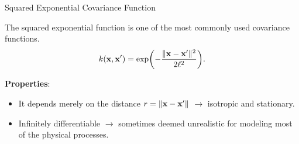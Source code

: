 \documentclass[11pt,compress,t,notes=noshow, xcolor=table]{beamer}
\begin{document}




\begin{vbframe}{Squared Exponential Covariance Function}

The squared exponential function is one of the most commonly used covariance functions.
$$
k(\mathbf{x}, \mathbf{x}^\prime) = \exp\biggl(- \frac{\|\mathbf{x} - \mathbf{x}^\prime\|^2}{2\ell^2}\biggr).
$$

\textbf{Properties}:
\begin{itemize}
\item It depends merely on the distance $r = \|\mathbf{x} - \mathbf{x}^\prime\|$ $\to$ isotropic and stationary.\lz
\item Infinitely differentiable $\to$ sometimes deemed 
  unrealistic for modeling most of the physical processes.

\end{itemize}

\end{vbframe}
\end{document}
